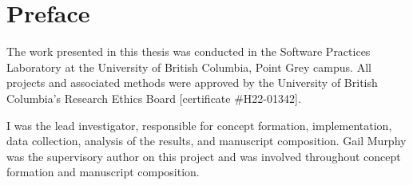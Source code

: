
\chapter{Preface}

The work presented in this thesis was conducted in the Software Practices Laboratory at the University of British Columbia, Point Grey campus.
All projects and associated methods were approved by the University of British Columbia's Research Ethics Board [certificate \#H22-01342].

I was the lead investigator, responsible for concept formation, implementation, data collection, analysis of the results, and manuscript composition.
Gail Murphy was the supervisory author on this project and was involved throughout concept formation and manuscript composition.

\endinput

The Preface must include a statement indicating the student's contribution to the following:

\begin{itemize}
    \item Identification and design of the research program,
    \item Performance of the various parts of the research, and
    \item Analysis of the research data.
    \item Certain additional elements may also be required, as specified below.
\end{itemize}

